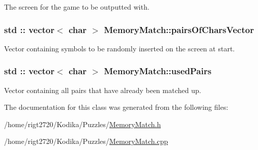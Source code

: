 The screen for the game to be outputted with. 

\hypertarget{classMemoryMatch_a377424818fa6730a40795ced32e201de}{
\subsubsection[{pairs\-Of\-Chars\-Vector}]{\setlength{\rightskip}{0pt plus 5cm}std \-:: vector$<$ char $>$ Memory\-Match\-::pairs\-Of\-Chars\-Vector\hspace{0.3cm}{\ttfamily [private]}}}\label{classMemoryMatch_a377424818fa6730a40795ced32e201de}


Vector containing symbols to be randomly inserted on the screen at start. 

\hypertarget{classMemoryMatch_a0398b30f4ef488ab7b3e1b10b2ecb75c}{
\subsubsection[{used\-Pairs}]{\setlength{\rightskip}{0pt plus 5cm}std \-:: vector$<$ char $>$ Memory\-Match\-::used\-Pairs\hspace{0.3cm}{\ttfamily [private]}}}\label{classMemoryMatch_a0398b30f4ef488ab7b3e1b10b2ecb75c}


Vector containing all pairs that have already been matched up. 



The documentation for this class was generated from the following files\-:\begin{DoxyCompactItemize}
\item 
/home/rigt2720/\-Kodika/\-Puzzles/\hyperlink{MemoryMatch_8h}{Memory\-Match.\-h}\item 
/home/rigt2720/\-Kodika/\-Puzzles/\hyperlink{MemoryMatch_8cpp}{Memory\-Match.\-cpp}\end{DoxyCompactItemize}
